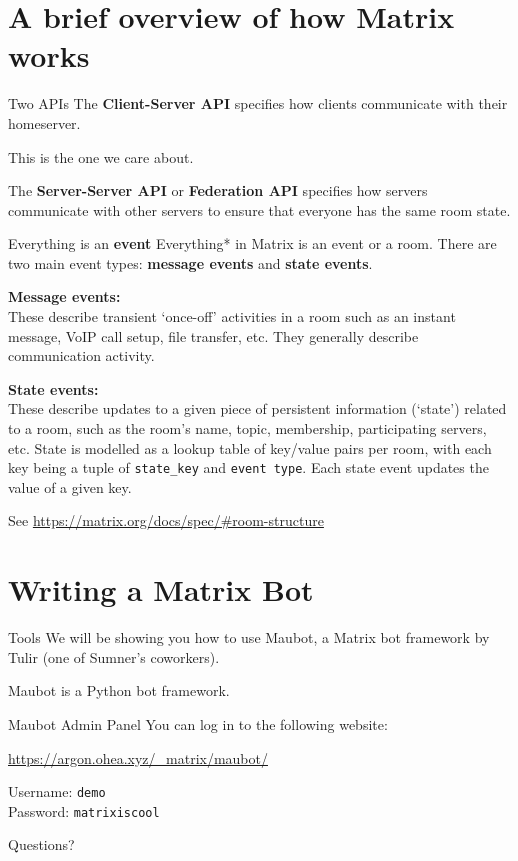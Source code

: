 \documentclass{acm}
\begin{document}
\section{A brief overview of how Matrix works}

\begin{frame}{Two APIs}
    The \textbf{Client-Server API} specifies how clients communicate with their
    homeserver.

    This is the one we care about. \pause

    The \textbf{Server-Server API} or \textbf{Federation API} specifies how
    servers communicate with other servers to ensure that everyone has the same
    room state.
\end{frame}

\begin{frame}{Everything is an \textbf{event}}
    Everything* in Matrix is an event or a room. There are two main event types:
    \textbf{message events} and \textbf{state events}.
    \pause

    \textbf{Message events:} \\
    These describe transient `once-off' activities in a room such as an instant
    message, VoIP call setup, file transfer, etc. They generally describe
    communication activity.
    \pause

    \textbf{State events:} \\
    These describe updates to a given piece of persistent information (`state')
    related to a room, such as the room's name, topic, membership, participating
    servers, etc. State is modelled as a lookup table of key/value pairs per
    room, with each key being a tuple of \texttt{state\_key} and \texttt{event
    type}. Each state event updates the value of a given key.

    {
        \tiny
        See \url{https://matrix.org/docs/spec/\#room-structure}
    }
\end{frame}

\section{Writing a Matrix Bot}

\begin{frame}{Tools}
    We will be showing you how to use Maubot, a Matrix bot framework by Tulir
    (one of Sumner's coworkers).

    Maubot is a Python bot framework.
\end{frame}

\begin{frame}{Maubot Admin Panel}
    You can log in to the following website:

    \begin{center}
        \Large
        \url{https://argon.ohea.xyz/_matrix/maubot/}
    \end{center}

    Username: \texttt{demo} \\
    Password: \texttt{matrixiscool}
\end{frame}

\begin{frame}[standout]
    \Huge
    Questions?
\end{frame}
\end{document}
